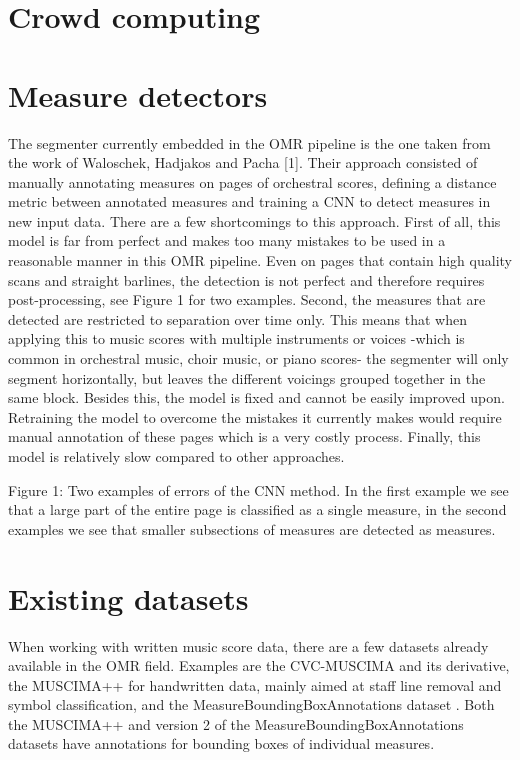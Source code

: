 \section{Crowd computing}\label{sec:related-work-crowd-computing}

\section{Measure detectors}
The segmenter currently embedded in the OMR pipeline is the one taken from the work of Waloschek, Hadjakos and Pacha [1]. Their approach consisted of manually annotating measures on pages of orchestral scores, defining a distance metric between annotated measures and training a CNN to detect measures in new input data. There are a few shortcomings to this approach. First of all, this model is far from perfect and makes too many mistakes to be used in a reasonable manner in this OMR pipeline. Even on pages that contain high quality scans and straight barlines, the detection is not perfect and therefore requires post-processing, see Figure 1 for two examples. Second, the measures that are detected are restricted to separation over time only. This means that when applying this to music scores with multiple instruments or voices -which is common in orchestral music, choir music, or piano scores- the segmenter will only segment horizontally, but leaves the different voicings grouped together in the same block. Besides this, the model is fixed and cannot be easily improved upon. Retraining the model to overcome the mistakes it currently makes would require manual annotation of these pages which is a very costly process. Finally, this model is relatively slow compared to other approaches. 

Figure 1: Two examples of errors of the CNN method. In the first example we see that a large part of the entire page is classified as a single measure, in the second examples we see that smaller subsections of measures are detected as measures.

\section{Existing datasets}\label{sec:related-work-existing-datasets}
When working with written music score data, there are a few datasets already available in the OMR field. Examples are the CVC-MUSCIMA \citep{Fornes2012} and its derivative, the MUSCIMA++ \citep{Hajic2017} for handwritten data, mainly aimed at staff line removal and symbol classification, and the MeasureBoundingBoxAnnotations dataset \citep{Zalkow2019}. Both the MUSCIMA++ and version 2 of the MeasureBoundingBoxAnnotations datasets have annotations for bounding boxes of individual measures.
